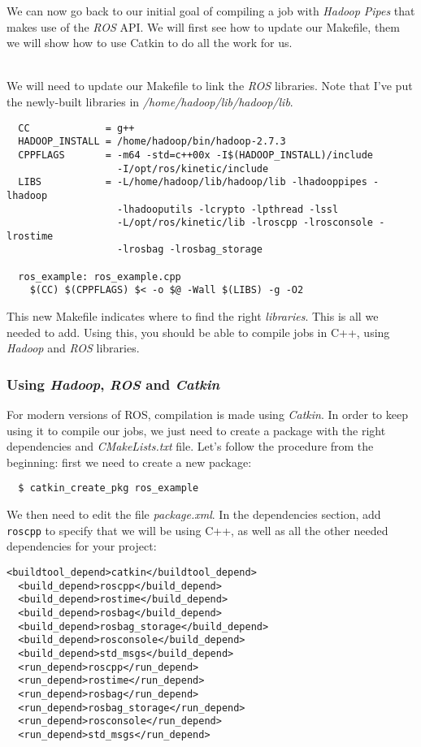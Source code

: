 \documentclass[a4paper, 12pt]{article}
\begin{document}
We can now go back to our initial goal of compiling a job with \textit{Hadoop Pipes} that makes use of the \textit{ROS} API. We will first see how to update our Makefile, them we will show how to use Catkin to do all the work for us.

~\\
We will need to update our Makefile to link the \textit{ROS} libraries. Note that I've put the newly-built libraries in \textit{/home/hadoop/lib/hadoop/lib}.

\begin{verbatim}
  CC             = g++
  HADOOP_INSTALL = /home/hadoop/bin/hadoop-2.7.3
  CPPFLAGS       = -m64 -std=c++00x -I$(HADOOP_INSTALL)/include
                   -I/opt/ros/kinetic/include
  LIBS           = -L/home/hadoop/lib/hadoop/lib -lhadooppipes -lhadoop
                   -lhadooputils -lcrypto -lpthread -lssl
                   -L/opt/ros/kinetic/lib -lroscpp -lrosconsole -lrostime
                   -lrosbag -lrosbag_storage

  ros_example: ros_example.cpp
    $(CC) $(CPPFLAGS) $< -o $@ -Wall $(LIBS) -g -O2
\end{verbatim}

This new Makefile indicates where to find the right \textit{libraries}. This is all we needed to add. Using this, you should be able to compile jobs in C++, using \textit{Hadoop} and \textit{ROS} libraries.

    \subsubsection{Using \textit{Hadoop}, \textit{ROS} and \textit{Catkin}}

For modern versions of ROS, compilation is made using \textit{Catkin}. In order to keep using it to compile our jobs, we just need to create a package with the right dependencies and \textit{CMakeLists.txt} file. Let's follow the procedure from the beginning: first we need to create a new package:

\begin{verbatim}
  $ catkin_create_pkg ros_example
\end{verbatim}

We then need to edit the file \textit{package.xml}. In the dependencies section, add \texttt{roscpp} to specify that we will be using C++, as well as all the other needed dependencies for your project:

\begin{lstlisting}[style=xml]
  <buildtool_depend>catkin</buildtool_depend>
  <build_depend>roscpp</build_depend>
  <build_depend>rostime</build_depend>
  <build_depend>rosbag</build_depend>
  <build_depend>rosbag_storage</build_depend>
  <build_depend>rosconsole</build_depend>
  <build_depend>std_msgs</build_depend>
  <run_depend>roscpp</run_depend>
  <run_depend>rostime</run_depend>
  <run_depend>rosbag</run_depend>
  <run_depend>rosbag_storage</run_depend>
  <run_depend>rosconsole</run_depend>
  <run_depend>std_msgs</run_depend>
\end{lstlisting}
\end{document}
